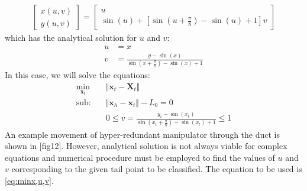 \documentclass[12pt,a4]{article}
\begin{document}
\begin{align}
\begin{bmatrix}
x(u,v)\\y(u,v)
\end{bmatrix} = 
\begin{bmatrix}
u\\\sin\left(u\right)+\left[\sin\left(u+\frac{\pi}{8}\right)-\sin\left(u\right)+1 \right]v
\end{bmatrix}
\end{align}
which has the analytical solution for $u$ and $v$:
\begin{align*}
u &= x\\
v &= \frac{y-\sin\left(x\right)}{\sin\left(x+\frac{\pi}{8}\right)-\sin\left(x\right)+1}
\end{align*}
In this case, we will solve the equations:
\begin{align}
\label{eq:analy2D}
\min_{\textbf{x}_t} &\Vert \textbf{x}_t-\textbf{X}_t \Vert\\
\nonumber \text{sub:~~~} &\Vert \textbf{x}_h - \textbf{x}_t \Vert -L_0 = 0\\
&0\leq v=\frac{y_t-\sin\left(x_t\right)}{\sin\left(x_t+\frac{\pi}{8}\right)-\sin\left(x_t\right)+1}\leq 1
\end{align} 
 An example movement of hyper-redundant manipulator through the duct is shown in [fig12]. However, analytical solution is not always viable for complex equations and numerical procedure must be employed to find the values of $u$ and $v$ corresponding to the given tail point to be classified. The equation to be used is \ref{eq:minx,u,v}.
\end{document}
